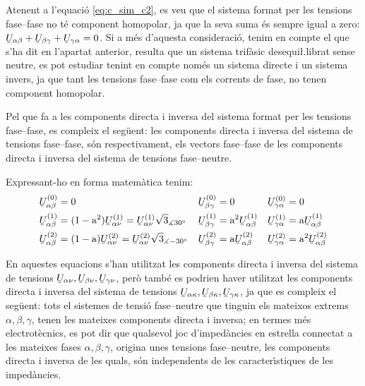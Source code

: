Atenent a l'equaci\'{o} \eqref{eq:c_sim_c2}, es veu que el sistema
format per les tensions fase--fase no t\'{e} component homopolar, ja que
la seva suma  \'{e}s sempre igual a zero: $\cmplx{U}_{\alpha\beta} +
\cmplx{U}_{\beta\gamma} + \cmplx{U}_{\gamma\alpha} = 0$. Si a m\'{e}s
d'aquesta consideraci\'{o}, tenim en compte el que s'ha dit en l'apartat
anterior, resulta que un sistema trif\`{a}sic desequi{\l.l}ibrat sense
neutre, es pot estudiar tenint en compte nom\'{e}s un sistema directe i
un sistema invers, ja que tant les tensions fase--fase com els
corrents de fase, no tenen component homopolar.

Pel que fa a les components directa i inversa del sistema format per
les tensions fase--fase, es compleix el seg\"{u}ent: les components
directa i inversa del sistema de tensions fase--fase, s\'{o}n
respectivament, els vectors fase--fase de les components directa i
inversa del sistema de tensions fase--neutre.

Expressant-ho en forma matem\`{a}tica tenim:
\begin{subequations}
\begin{align}
   \cmplx{U}_{\alpha\beta}\ap{(0)} &= 0 &
   \cmplx{U}_{\beta\gamma}\ap{(0)} &= 0 &
   \cmplx{U}_{\gamma\alpha}\ap{(0)} &= 0 \\
   \cmplx{U}_{\alpha\beta}\ap{(1)} &= (1-\au^2) \cmplx{U}_{\alpha\nu}\ap{(1)} =
   \cmplx{U}_{\alpha\nu}\ap{(1)} \sqrt{3}_{\measuredangle 30\degree} &
   \cmplx{U}_{\beta\gamma}\ap{(1)} &= \au^2 \cmplx{U}_{\alpha\beta}\ap{(1)} &
   \cmplx{U}_{\gamma\alpha}\ap{(1)} &= \au \cmplx{U}_{\alpha\beta}\ap{(1)} \label{eq:c_sim_a3} \\
   \cmplx{U}_{\alpha\beta}\ap{(2)} &= (1-\au) \cmplx{U}_{\alpha\nu}\ap{(2)}  =
   \cmplx{U}_{\alpha\nu}\ap{(2)} \sqrt{3}_{\measuredangle -30\degree}&
   \cmplx{U}_{\beta\gamma}\ap{(2)} &= \au \cmplx{U}_{\alpha\beta}\ap{(2)} &
   \cmplx{U}_{\gamma\alpha}\ap{(2)} &= \au^2 \cmplx{U}_{\alpha\beta}\ap{(2)} \label{eq:c_sim_b3}
\end{align}
\end{subequations}

En aquestes equacions s'han utilitzat les components directa i
inversa del sistema de tensions
$\cmplx{U}_{\alpha\nu},\cmplx{U}_{\beta\nu},\cmplx{U}_{\gamma\nu}$,
per\`{o} tamb\'{e} es podrien haver utilitzat les components directa i
inversa del sistema de tensions
$\cmplx{U}_{\alpha\kappa},\cmplx{U}_{\beta\kappa},\cmplx{U}_{\gamma\kappa}$,
ja que es compleix el seg\"{u}ent: tots el sistemes de tensi\'{o}
fase--neutre que tinguin els mateixos extrems $\alpha, \beta,
\gamma$, tenen les mateixes components directa i inversa; en termes
m\'{e}s electrot\`{e}cnics, es pot dir que qualsevol joc d'imped\`{a}ncies en
estrella connectat a les mateixes fases $\alpha, \beta, \gamma$,
origina unes tensions fase--neutre, les components directa i inversa
de les quals, s\'{o}n independents de les caracter\'{\i}stiques de les
imped\`{a}ncies.

